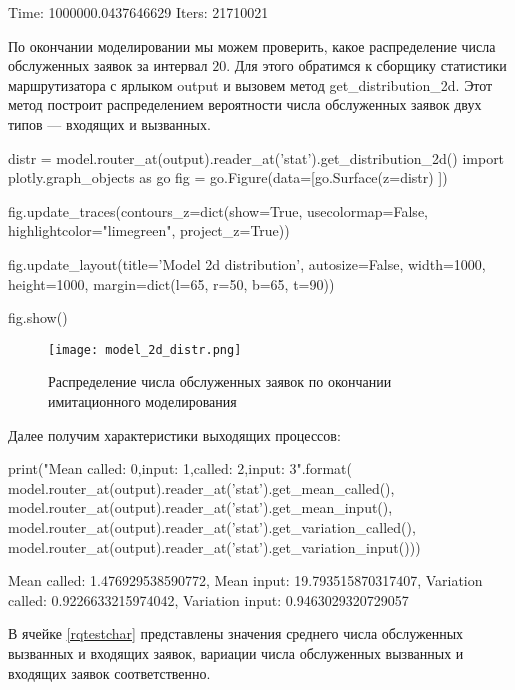 \begin{pyout}
Time:  1000000.0437646629
Iters:  21710021
\end{pyout}

По окончании моделировании мы можем проверить, какое распределение числа обслуженных заявок за интервал $20$. Для этого обратимся к сборщику статистики маршрутизатора с ярлыком output и вызовем метод get\_distribution\_2d. Этот метод построит распределением вероятности числа обслуженных заявок двух типов --- входящих и вызванных.
\begin{pyin}
distr = model.router_at(output).reader_at('stat').get_distribution_2d()
import plotly.graph_objects as go
fig = go.Figure(data=[go.Surface(z=distr) ])

fig.update_traces(contours_z=dict(show=True, usecolormap=False,
highlightcolor="limegreen", project_z=True))

fig.update_layout(title='Model 2d distribution', autosize=False,
width=1000, height=1000,
margin=dict(l=65, r=50, b=65, t=90))

fig.show()
\end{pyin}

\begin{figure}[H]
	\centering
	\texttt{[image: model\_2d\_distr.png]}
	\caption{Распределение числа обслуженных заявок по окончании имитационного моделирования} 
	\label{model_2d_distr}
\end{figure}

Далее получим характеристики выходящих процессов:

\begin{pyin} [rqtestchar]
print("Mean  called: {0},\nMean input: {1},\nVariation called: {2},\nVariation input: {3}".format(
model.router_at(output).reader_at('stat').get_mean_called(),
model.router_at(output).reader_at('stat').get_mean_input(),
model.router_at(output).reader_at('stat').get_variation_called(),
model.router_at(output).reader_at('stat').get_variation_input()))
\end{pyin}

\begin{pyout} 
Mean  called: 1.476929538590772,
Mean input: 19.793515870317407,
Variation called: 0.9226633215974042,
Variation input: 0.9463029320729057
\end{pyout}

В ячейке \ref{rqtestchar} представлены значения среднего числа обслуженных вызванных и входящих заявок, вариации числа обслуженных вызванных и входящих заявок соответственно.

